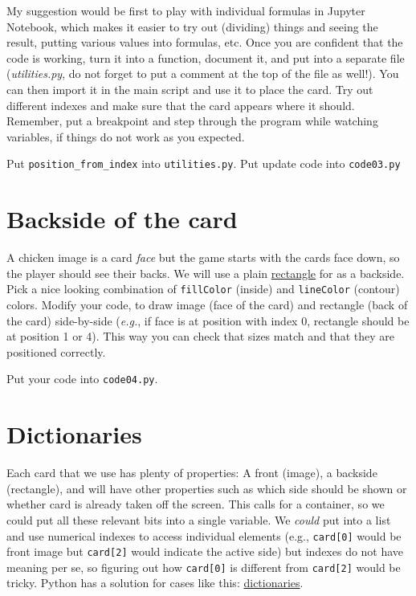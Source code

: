 \documentclass[
]{book}
\begin{document}
My suggestion would be first to play with individual formulas in Jupyter Notebook, which makes it easier to try out (dividing) things and seeing the result, putting various values into formulas, etc. Once you are confident that the code is working, turn it into a function, document it, and put into a separate file (\emph{utilities.py}, do not forget to put a comment at the top of the file as well!). You can then import it in the main script and use it to place the card. Try out different indexes and make sure that the card appears where it should. Remember, put a breakpoint and step through the program while watching variables, if things do not work as you expected.

Put \texttt{position\_from\_index} into \texttt{utilities.py}.
Put update code into \texttt{code03.py}

\hypertarget{backside-of-the-card}{%
\section{Backside of the card}\label{backside-of-the-card}}

A chicken image is a card \emph{face} but the game starts with the cards face down, so the player should see their backs. We will use a plain \href{https://psychopy.org/api/visual/rect.html}{rectangle} for as a backside. Pick a nice looking combination of \texttt{fillColor} (inside) and \texttt{lineColor} (contour) colors. Modify your code, to draw image (face of the card) and rectangle (back of the card) side-by-side (\emph{e.g.}, if face is at position with index 0, rectangle should be at position 1 or 4). This way you can check that sizes match and that they are positioned correctly.

Put your code into \texttt{code04.py}.

\hypertarget{dictionaries}{%
\section{Dictionaries}\label{dictionaries}}

Each card that we use has plenty of properties: A front (image), a backside (rectangle), and will have other properties such as which side should be shown or whether card is already taken off the screen. This calls for a container, so we could put all these relevant bits into a single variable. We \emph{could} put into a list and use numerical indexes to access individual elements (e.g., \texttt{card{[}0{]}} would be front image but \texttt{card{[}2{]}} would indicate the active side) but indexes do not have meaning per se, so figuring out how \texttt{card{[}0{]}} is different from \texttt{card{[}2{]}} would be tricky. Python has a solution for cases like this: \href{https://docs.python.org/3/library/stdtypes.html\#dict}{dictionaries}.
\end{document}
